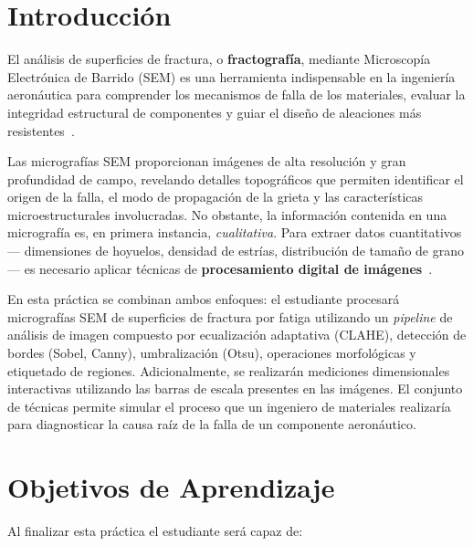 \documentclass[12pt,a4paper]{article}
\begin{document}
\tableofcontents
\newpage

\section{Introducción}
\label{sec:intro}

El análisis de superficies de fractura, o \textbf{fractografía}, mediante
Microscopía Electrónica de Barrido (SEM) es una herramienta indispensable
en la ingeniería aeronáutica para comprender los mecanismos de falla de los
materiales, evaluar la integridad estructural de componentes y guiar el
diseño de aleaciones más resistentes~\cite{asm_fractography,hull1999}.

Las micrografías SEM proporcionan imágenes de alta resolución y gran
profundidad de campo, revelando detalles topográficos que permiten
identificar el origen de la falla, el modo de propagación de la grieta y
las características microestructurales involucradas.  No obstante, la
información contenida en una micrografía es, en primera instancia,
\emph{cualitativa}.  Para extraer datos cuantitativos --- dimensiones de
hoyuelos, densidad de estrías, distribución de tamaño de grano --- es
necesario aplicar técnicas de \textbf{procesamiento digital de
	imágenes}~\cite{gonzalez2018,russ2016}.

En esta práctica se combinan ambos enfoques: el estudiante procesará
micrografías SEM de superficies de fractura por fatiga utilizando un
\emph{pipeline} de análisis de imagen compuesto por ecualización adaptativa
(CLAHE), detección de bordes (Sobel, Canny), umbralización (Otsu),
operaciones morfológicas y etiquetado de regiones.  Adicionalmente, se
realizarán mediciones dimensionales interactivas utilizando las barras de
escala presentes en las imágenes.  El conjunto de técnicas permite simular
el proceso que un ingeniero de materiales realizaría para diagnosticar la
causa raíz de la falla de un componente aeronáutico.

\section{Objetivos de Aprendizaje}
\label{sec:objetivos}

Al finalizar esta práctica el estudiante será capaz de:
\end{document}
